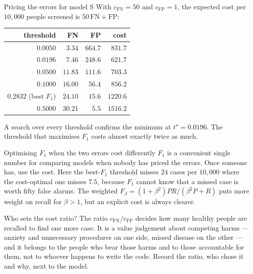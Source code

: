 \begin{workedexample}{Pricing the errors for model S}
With $c_{\text{FN}} = 50$ and $c_{\text{FP}} = 1$, the expected cost per
$10{,}000$ people screened is $50\,\text{FN} + \text{FP}$:

\begin{center}
\small
\renewcommand{\arraystretch}{1.15}
\begin{tabular}{@{}rrrr@{}}
\toprule
threshold & FN & FP & cost\\
\midrule
$0.0050$ & $3.34$  & $664.7$ & $831.7$\\
$0.0196$ & $7.46$  & $248.6$ & $\mathbf{621.7}$\\
$0.0500$ & $11.83$ & $111.6$ & $703.3$\\
$0.1000$ & $16.00$ & $56.4$  & $856.2$\\
$0.2832$ (best $F_1$) & $24.10$ & $15.6$ & $1220.6$\\
$0.5000$ & $30.21$ & $5.5$   & $1516.2$\\
\bottomrule
\end{tabular}
\end{center}

A search over every threshold confirms the minimum at $t^\star = 0.0196$. The
threshold that maximises $F_1$ costs almost exactly twice as much.
\end{workedexample}

\begin{pitfall}{Optimising $F_1$ when the two errors cost differently}
$F_1$ is a convenient single number for comparing models when nobody has priced
the errors. Once someone has, use the cost. Here the best-$F_1$ threshold misses
$24$ cases per $10{,}000$ where the cost-optimal one misses $7.5$, because $F_1$
cannot know that a missed case is worth fifty false alarms. The weighted
$F_\beta = (1+\beta^2)PR/(\beta^2P + R)$ puts more weight on recall for
$\beta > 1$, but an explicit cost is always clearer.
\end{pitfall}

\begin{ethicsnote}{Who sets the cost ratio?}
The ratio $c_{\text{FN}}/c_{\text{FP}}$ decides how many healthy people are
recalled to find one more case. It is a value judgement about competing harms
--- anxiety and unnecessary procedures on one side, missed disease on the other
--- and it belongs to the people who bear those harms and to those accountable
for them, not to whoever happens to write the code. Record the ratio, who chose
it and why, next to the model.
\end{ethicsnote}

